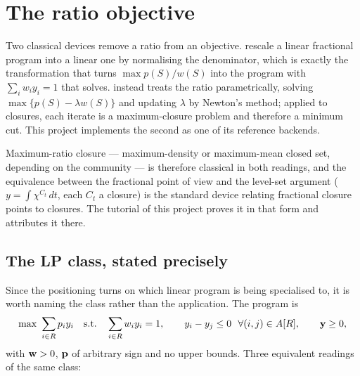 \section{The ratio objective}\label{sec:ratio}

Two classical devices remove a ratio from an objective. \citet{CharnesCooper1962}
rescale a linear fractional program into a linear one by normalising the
denominator, which is exactly the transformation that turns
\(\max p(S)/w(S)\) into the program with \(\sum_i w_i y_i = 1\) that \FS{}
solves. \citet{Dinkelbach1967} instead treats the ratio parametrically, solving
\(\max\{p(S) - \lambda w(S)\}\) and updating \(\lambda\) by Newton's method;
applied to closures, each iterate is a maximum-closure problem and therefore a
minimum cut. This project implements the second as one of its reference
backends.

Maximum-ratio closure --- maximum-density or maximum-mean closed set, depending
on the community --- is therefore classical in both readings, and the
equivalence between the fractional point of view and the level-set argument
(\(y = \int \chi^{C_t}\,dt\), each \(C_t\) a closure) is the standard device
relating fractional closure points to closures. The tutorial of this project
proves it in that form and attributes it there.

\subsection{The LP class, stated precisely}\label{sec:class}

Since the positioning turns on which linear program is being specialised to, it
is worth naming the class rather than the application. The program is
\begin{equation}\label{eq:class}
  \max\ \sum_{i \in R} p_i y_i
  \quad\text{s.t.}\quad
  \sum_{i \in R} w_i y_i = 1,
  \qquad y_i - y_j \le 0 \ \ \forall (i,j) \in A[R],
  \qquad \mathbf{y} \ge 0,
\end{equation}
with $\mathbf{w} > 0$, $\mathbf{p}$ of arbitrary sign and no upper bounds. Three equivalent
readings of the same class:

